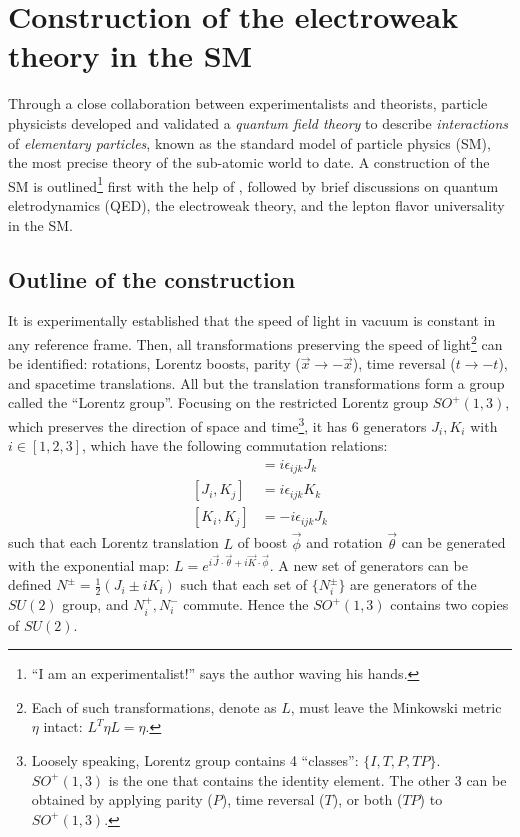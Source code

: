 \section{Construction of the electroweak theory in the SM}

Through a close collaboration between experimentalists and theorists,
particle physicists developed and validated a \emph{quantum field theory}
to describe \emph{interactions} of \emph{elementary particles},
known as the standard model of particle physics (SM),
the most precise theory of the sub-atomic world to date.
A construction of the SM is outlined\footnote{
    ``I am an experimentalist!'' says the author waving his hands.
} first with the help of
\cite{Robinson_2011,Schwichtenberg_2018},
followed by brief discussions on quantum eletrodynamics (QED),
the electroweak theory, and the lepton flavor universality in the SM.


\subsection{Outline of the construction}

It is experimentally established that the speed of light in vacuum is constant
in any reference frame.
Then, all transformations preserving the speed of light\footnote{
    Each of such transformations, denote as $L$, must leave the Minkowski metric
    $\eta$ intact: $L^T \eta L = \eta$.
} can be identified:
rotations, Lorentz boosts, parity ($\vec{x} \rightarrow -\vec{x}$),
time reversal ($t \rightarrow -t$), and spacetime translations.
All but the translation transformations form a group called the
``Lorentz group''.
Focusing on the restricted Lorentz group $SO^+(1, 3)$,
which preserves the direction of space and time\footnote{
    Loosely speaking, Lorentz group contains 4 ``classes'': $\{I, T, P, TP\}$.
    $SO^+(1,3)$ is the one that contains the identity element.
    The other 3 can be obtained by applying parity ($P$), time reversal ($T$),
    or both ($TP$) to $SO^+(1,3)$.
},
it has 6 generators $J_i, K_i$ with $i \in [1,2,3]$,
which have the following commutation relations:
\begin{align}
    [J_i, J_j] & = i \epsilon_{ijk} J_k \\
    [J_i, K_j] & = i \epsilon_{ijk} K_k \\
    [K_i, K_j] & = -i \epsilon_{ijk} J_k
\end{align}
such that each Lorentz translation $L$ of boost $\vec{\phi}$ and rotation
$\vec{\theta}$ can be generated with the exponential map:
$L = e^{i \vec{J} \cdot \vec{\theta} + i \vec{K} \cdot \vec{\phi}}$.
A new set of generators can be defined
$N^\pm = \frac{1}{2}(J_i \pm i K_i)$ such that each set of $\{N^\pm_i\}$
are generators of the $SU(2)$ group, and $N^+_i, N^-_i$ commute.
Hence the $SO^+(1, 3)$ contains two copies of $SU(2)$.

